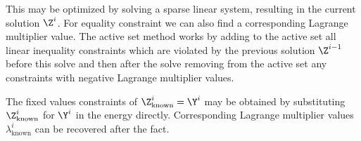 \documentclass{diary}
\newcommand{\Aieq}{\mat{A}_\text{ieq}}
\newcommand{\Bieq}{\vc{B}_\text{ieq}}
\newcommand*\Bell{\ensuremath{\boldsymbol\ell}}
\newcommand{\lx}{\Bell}
\newcommand{\ux}{\vc{u}}
\begin{document}
This may be optimized by solving a sparse linear system, resulting in the
current solution $\Z^i$. For equality constraint we can also find a
corresponding Lagrange multiplier value. The active set method works by adding
to the active set all linear inequality constraints which are violated by the
previous solution $\Z^{i-1}$ before this solve and then after the solve
removing from the active set any constraints with negative Lagrange multiplier
values.


The fixed values constraints of $\Z_\text{known}^i = \Y^i$ may be obtained by
substituting $\Z_\text{known}^i$ for $\Y^i$ in the energy directly.
Corresponding Lagrange multiplier values $\lambda_\text{known}^i$ can be
recovered after the fact.

\end{document}
